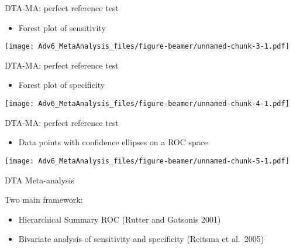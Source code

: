 \documentclass[
  ignorenonframetext,
  aspectratio=43,
]{beamer}
\providecommand{\tightlist}{%
  \setlength{\itemsep}{0pt}\setlength{\parskip}{0pt}}
\begin{document}
\begin{frame}{DTA-MA: perfect reference test}
\protect\hypertarget{dta-ma-perfect-reference-test-2}{}

\begin{itemize}
\tightlist
\item
  Forest plot of sensitivity
\end{itemize}

\texttt{[image: Adv6\_MetaAnalysis\_files/figure-beamer/unnamed-chunk-3-1.pdf]}

\end{frame}

\begin{frame}{DTA-MA: perfect reference test}
\protect\hypertarget{dta-ma-perfect-reference-test-3}{}

\begin{itemize}
\tightlist
\item
  Forest plot of specificity
\end{itemize}

\texttt{[image: Adv6\_MetaAnalysis\_files/figure-beamer/unnamed-chunk-4-1.pdf]}

\end{frame}

\begin{frame}{DTA-MA: perfect reference test}
\protect\hypertarget{dta-ma-perfect-reference-test-4}{}

\begin{itemize}
\tightlist
\item
  Data points with confidence ellipses on a ROC space
\end{itemize}

\texttt{[image: Adv6\_MetaAnalysis\_files/figure-beamer/unnamed-chunk-5-1.pdf]}

\end{frame}

\begin{frame}{DTA Meta-analysis}
\protect\hypertarget{dta-meta-analysis}{}

Two main framework:

\begin{itemize}
\item
  Hierarchical Summary ROC (Rutter and Gatsonis 2001)
\item
  Bivariate analysis of sensitivity and specificity (Reitsma et
  al.~2005)
\end{itemize}

\end{frame}
\end{document}
